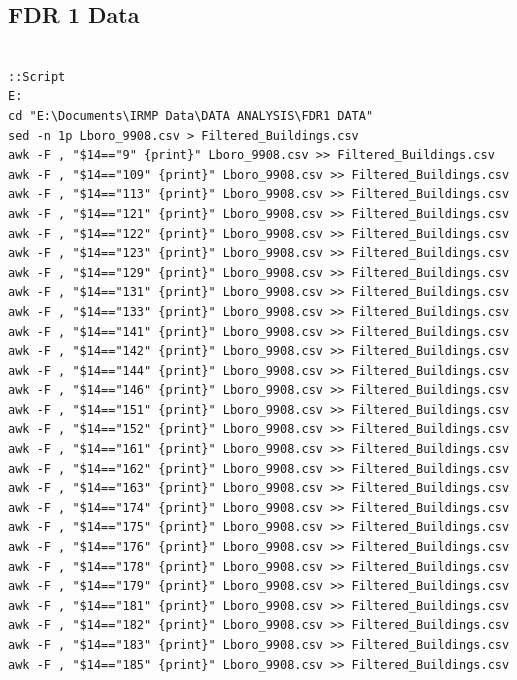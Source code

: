 \documentclass[table,a4paper,oneside]{book}
\begin{document}
\appendix
\begin{singlespace}
\chapter{FDR 1 Data}
\label{app:FDR1 Data}

\begin{lstlisting}

::Script
E:
cd "E:\Documents\IRMP Data\DATA ANALYSIS\FDR1 DATA"
sed -n 1p Lboro_9908.csv > Filtered_Buildings.csv
awk -F , "$14=="9" {print}" Lboro_9908.csv >> Filtered_Buildings.csv
awk -F , "$14=="109" {print}" Lboro_9908.csv >> Filtered_Buildings.csv
awk -F , "$14=="113" {print}" Lboro_9908.csv >> Filtered_Buildings.csv
awk -F , "$14=="121" {print}" Lboro_9908.csv >> Filtered_Buildings.csv
awk -F , "$14=="122" {print}" Lboro_9908.csv >> Filtered_Buildings.csv
awk -F , "$14=="123" {print}" Lboro_9908.csv >> Filtered_Buildings.csv
awk -F , "$14=="129" {print}" Lboro_9908.csv >> Filtered_Buildings.csv
awk -F , "$14=="131" {print}" Lboro_9908.csv >> Filtered_Buildings.csv
awk -F , "$14=="133" {print}" Lboro_9908.csv >> Filtered_Buildings.csv
awk -F , "$14=="141" {print}" Lboro_9908.csv >> Filtered_Buildings.csv
awk -F , "$14=="142" {print}" Lboro_9908.csv >> Filtered_Buildings.csv
awk -F , "$14=="144" {print}" Lboro_9908.csv >> Filtered_Buildings.csv
awk -F , "$14=="146" {print}" Lboro_9908.csv >> Filtered_Buildings.csv
awk -F , "$14=="151" {print}" Lboro_9908.csv >> Filtered_Buildings.csv
awk -F , "$14=="152" {print}" Lboro_9908.csv >> Filtered_Buildings.csv
awk -F , "$14=="161" {print}" Lboro_9908.csv >> Filtered_Buildings.csv
awk -F , "$14=="162" {print}" Lboro_9908.csv >> Filtered_Buildings.csv
awk -F , "$14=="163" {print}" Lboro_9908.csv >> Filtered_Buildings.csv
awk -F , "$14=="174" {print}" Lboro_9908.csv >> Filtered_Buildings.csv
awk -F , "$14=="175" {print}" Lboro_9908.csv >> Filtered_Buildings.csv
awk -F , "$14=="176" {print}" Lboro_9908.csv >> Filtered_Buildings.csv
awk -F , "$14=="178" {print}" Lboro_9908.csv >> Filtered_Buildings.csv
awk -F , "$14=="179" {print}" Lboro_9908.csv >> Filtered_Buildings.csv
awk -F , "$14=="181" {print}" Lboro_9908.csv >> Filtered_Buildings.csv
awk -F , "$14=="182" {print}" Lboro_9908.csv >> Filtered_Buildings.csv
awk -F , "$14=="183" {print}" Lboro_9908.csv >> Filtered_Buildings.csv
awk -F , "$14=="185" {print}" Lboro_9908.csv >> Filtered_Buildings.csv

\end{lstlisting}
\end{singlespace}
\end{document}
